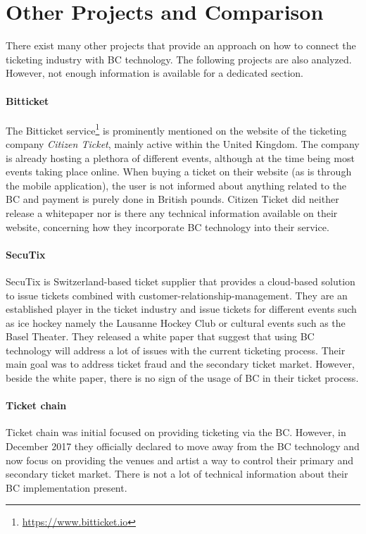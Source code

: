 \section{Other Projects and Comparison}

There exist many other projects that provide an approach on how to connect the ticketing industry with BC technology. The following projects are also analyzed. However, not enough information is available for a dedicated section.

\paragraph{Bitticket}
The Bitticket service\footnote{\href{https://www.bitticket.io}{https://www.bitticket.io}} is prominently mentioned on the website of the ticketing company \textit{Citizen Ticket}, mainly active within the United Kingdom. The company is already hosting a plethora of different events, although at the time being most events taking place online. When buying a ticket on their website (as is through the mobile application), the user is not informed about anything related to the BC and payment is purely done in British pounds. Citizen Ticket did neither release a whitepaper nor is there any technical information available on their website, concerning how they incorporate BC technology into their service.

\paragraph{SecuTix}
SecuTix \cite{SECUTIX} is Switzerland-based ticket supplier that provides a cloud-based solution to issue tickets combined with customer-relationship-management. They are an established player in the ticket industry and issue tickets for different events such as ice hockey namely the Lausanne Hockey Club or cultural events such as the Basel Theater. They released a white paper that suggest that using BC technology will address a lot of issues with the current ticketing process. Their main goal was to address ticket fraud and the secondary ticket market. However, beside the white paper, there is no sign of the usage of BC in their ticket process.

\paragraph{Ticket chain}
Ticket chain \cite{TicketChain} was initial focused on providing ticketing via the BC. However, in December 2017 they officially declared to move away from the BC technology and now focus on providing the venues and artist a way to control their primary and secondary ticket market. There is not a lot of technical information about their BC implementation present. 

